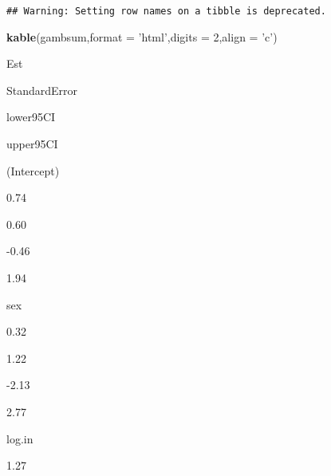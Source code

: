 \documentclass[]{article}
\newenvironment{Shaded}{\begin{snugshade}}{\end{snugshade}}
\newcommand{\DataTypeTok}[1]{\textcolor[rgb]{0.13,0.29,0.53}{#1}}
\newcommand{\DecValTok}[1]{\textcolor[rgb]{0.00,0.00,0.81}{#1}}
\newcommand{\KeywordTok}[1]{\textcolor[rgb]{0.13,0.29,0.53}{\textbf{#1}}}
\newcommand{\NormalTok}[1]{#1}
\newcommand{\OperatorTok}[1]{\textcolor[rgb]{0.81,0.36,0.00}{\textbf{#1}}}
\newcommand{\StringTok}[1]{\textcolor[rgb]{0.31,0.60,0.02}{#1}}
\begin{document}
\begin{Shaded}
\end{Shaded}

\begin{verbatim}
## Warning: Setting row names on a tibble is deprecated.
\end{verbatim}

\begin{Shaded}
\begin{Highlighting}[]
\KeywordTok{kable}\NormalTok{(gambsum,}\DataTypeTok{format =} \StringTok{'html'}\NormalTok{,}\DataTypeTok{digits =} \DecValTok{2}\NormalTok{,}\DataTypeTok{align =} \StringTok{'c'}\NormalTok{)}
\end{Highlighting}
\end{Shaded}

Est

StandardError

lower95CI

upper95CI

(Intercept)

0.74

0.60

-0.46

1.94

sex

0.32

1.22

-2.13

2.77

log.in

1.27
\end{document}
